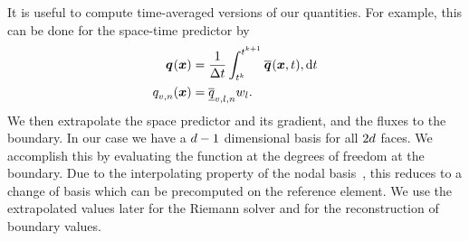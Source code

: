 It is useful to compute time-averaged versions of our quantities.
For example, this can be done for the space-time predictor by
\begin{align}\label{eq:time-average}
  \begin{split}
  \spredictor (\bm{x}) &= \frac{1}{\Delta t} \intdt{
\stpredictor(\bm{x}, t),
  } \\
\spredictor[][v,n] (\bm{x}) &= \stpredictorCoeff[][v,l,n] \quadWeight[l].
  \end{split}
\end{align}
We then extrapolate the space predictor and its gradient, and the fluxes to the boundary.
In our case we have a $d - 1$ dimensional basis for all $2 d$ faces.
We accomplish this by evaluating the function at the degrees of freedom at the boundary.
Due to the interpolating property of the nodal basis~, this reduces to a change of basis which can be precomputed on the reference element.
We use the extrapolated values later for the Riemann solver and for the reconstruction of boundary values.

